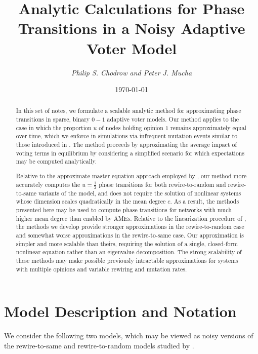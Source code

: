 \documentclass[english]{scrartcl}
\title{Analytic Calculations for Phase Transitions in a Noisy Adaptive Voter Model}
\author{\emph{Philip S. Chodrow and Peter J. Mucha}}
\date{\today}
\begin{document}

\maketitle
	\begin{abstract}
		In this set of notes, we formulate a scalable analytic method for approximating phase transitions in sparse, binary $0-1$ adaptive voter models. Our method applies to the case in which the proportion $u$ of nodes holding opinion $1$ remains approximately equal over time, which we enforce in simulations via infrequent mutation events similar to those introduced in \cite{Ji2013}. The method proceeds by approximating the average impact of voting terms in equilibrium by considering a simplified scenario for which expectations may be computed analytically. 

		Relative to the approximate master equation approach employed by \cite{Durrett2012}, our method more accurately computes the $u = \frac{1}{2}$ phase transitions for both rewire-to-random and rewire-to-same variants of the model, and does not require the solution of nonlinear systems whose dimension scales quadratically in the mean degree $c$. As a result, the methods presented here may be used to compute phase transitions for networks with much higher mean degree than enabled by AMEs. Relative to the linearization procedure of \cite{Bohme2011}, the methods we develop provide stronger approximations in the rewire-to-random case and somewhat worse approximations in the rewire-to-same case. Our approximation is simpler and more scalable than theirs, requiring the solution of a single, closed-form nonlinear equation rather than an eigenvalue decomposition. The strong scalability of these methods may make possible previously intractable approximations for systems with multiple opinions and variable rewiring and mutation rates. 
	\end{abstract}


\section{Model Description and Notation}
	
	We consider the following two models, which may be viewed as noisy versions of the rewire-to-same and rewire-to-random models studied by \cite{Durrett2012}. 
\end{document}
